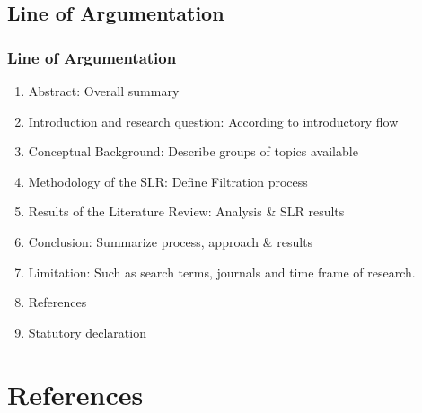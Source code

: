 \documentclass[
	11pt, %
]{beamer}
\begin{document}
\subsection{Line of Argumentation}
\begin{frame}
	\frametitle{Line of Argumentation}
	
	\bigskip %
	
	\begin{enumerate}

        \bigskip %
        \item Abstract: Overall summary
        
        \bigskip %
        \item Introduction and research question: According to introductory flow

        \bigskip %
        \item Conceptual Background: Describe groups of topics available

        \bigskip %
        \item Methodology of the SLR: Define Filtration process

        \bigskip %
        \item Results of the Literature Review: Analysis & SLR results

        \bigskip %
        \item Conclusion: Summarize process, approach & results

        \bigskip %
        \item Limitation: Such as search terms, journals and time frame of research.

        \bigskip %
        \item References

        \bigskip %
        \item Statutory declaration

	\end{enumerate}
\end{frame}

\iffalse
\section{References}
\end{document}
